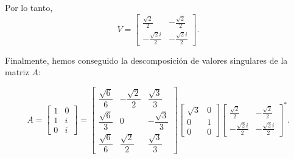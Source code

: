 \begin{frame}
	\begin{solution}
		Por lo tanto,
		\begin{equation*}
			V=
			\begin{bmatrix}
				\frac{\sqrt{2}}{2}    & -\frac{\sqrt{2}}{2}   \\
				-\frac{\sqrt{2} i}{2} & -\frac{\sqrt{2} i}{2}
			\end{bmatrix}.
		\end{equation*}

		Finalmente, hemos conseguido la descomposición de valores singulares de la matriz $A$:

		\begin{equation*}
			A=
			\begin{bmatrix}
				1 & 0 \\
				1 & i \\
				0 & i
			\end{bmatrix}=
			\begin{bmatrix}
				\dfrac{\sqrt{6}}{6} & -\dfrac{\sqrt{2}}{2} & \dfrac{\sqrt{3}}{3}  \\
				\dfrac{\sqrt{6}}{3} & 0                    & -\dfrac{\sqrt{3}}{3} \\
				\dfrac{\sqrt{6}}{6} & \dfrac{\sqrt{2}}{2}  & \dfrac{\sqrt{3}}{3}
			\end{bmatrix}
			\begin{bmatrix}
				\sqrt{3} & 0 \\
				0        & 1 \\
				0        & 0
			\end{bmatrix}
			{\begin{bmatrix}
				\frac{\sqrt{2}}{2}    & -\frac{\sqrt{2}}{2}   \\
				-\frac{\sqrt{2} i}{2} & -\frac{\sqrt{2} i}{2}
			\end{bmatrix}}^{\ast}.
		\end{equation*}
	\end{solution}
\end{frame}